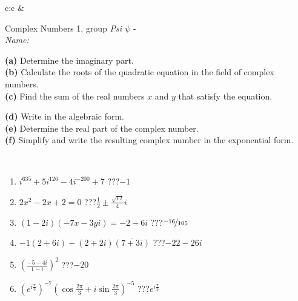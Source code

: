 \documentclass[10pt]{report}
\begin{document}
\begin{tabular}{c:c}
&
\begin{minipage}[c][104.5mm][t]{0.5\linewidth}
\begin{center}
\vspace{5mm}
{\huge Complex Numbers 1, group \textit{Psi $\psi$} -}\\[5mm]
\textit{Name:}\phantom{xxxxxxxxxxxxxxxxxxxxxxxxxxxxxxxxxxxxxxxxxxxxxxxxxxxxxxxxxxxxxxxxx}\\[5mm]
\begin{minipage}{0.95\linewidth}
\begin{center}
{\small \begin{minipage}{0.44\textwidth} \raggedright
\textbf{(a)} Determine the imaginary part. \\[1mm]
\textbf{(b)} Calculate the roots of the quadratic equation in the field of complex numbers. \\[1mm]
\textbf{(c)} Find the sum of the real numbers \(x\) and \(y\) that satisfy the equation. \end{minipage} \begin{minipage}{0.54\textwidth}
\textbf{(d)} Write in the algebraic form. \\[1mm]
\textbf{(e)} Determine the real part of the complex number. \\[1mm]
\textbf{(f)} Simplify and write the resulting complex number in the exponential form.
\end{minipage}
} \vspace{3mm}
\end{center}
\end{minipage}
\\[1mm]
\begin{minipage}{0.79\linewidth}
\begin{center}
\begin{varwidth}{\linewidth}
\setlength{\itemsep}{0pt}
\begin{enumerate}
\large
\item $i^{635}+5i^{126}-4i^{-200}+7$\quad \dotfill\; ???\;\dotfill \quad $-1$
\item $2x^2-2x+2=0$\quad \dotfill\; ???\;\dotfill \quad $\frac{1}{2} \pm{}\frac{ \sqrt{12}}{4}i$
\item $(1-2i)(-7x-3yi)=-2-6i$\quad \dotfill\; ???\;\dotfill \quad $\nicefrac{-16}{105}$
\item $-1(2+6i)-(2+2i)\overline{(7+3i)}$\quad \dotfill\; ???\;\dotfill \quad $-22-26i$
\item $\left(\frac{-5-4i}{1-i}\right)^2$\quad \dotfill\; ???\;\dotfill \quad $-20$
\item $\left(e^{i\frac{\pi}{3}}\right)^{-7}\left(\cos{\frac{2\pi}{3}}+i\sin{\frac{2\pi}{3}}\right)^{-5}$\quad \dotfill\; ???\;\dotfill \quad $e^{i\frac{\pi}{3}}$

\end{enumerate}
\end{varwidth}
\end{center}
\end{minipage}
\end{center}
\end{minipage}
\end{tabular}
\end{document}
